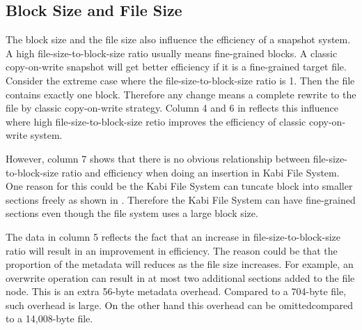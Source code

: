 \subsection{Block Size and File Size}

    The block size and the file size also influence the efficiency of a snapshot system. A high file-size-to-block-size ratio usually means fine-grained blocks. A classic copy-on-write snapshot will get better efficiency if it is a fine-grained target file. Consider the extreme case where the file-size-to-block-size ratio is 1. Then the file contains exactly one block. Therefore any change means a complete rewrite to the file by classic copy-on-write strategy. Column 4 and 6 in  reflects this influence where high file-size-to-block-size retio improves the efficiency of classic copy-on-write system.

    However, column 7 shows that there is no obvious relationship between file-size-to-block-size ratio and efficiency when doing an insertion in Kabi File System. One reason for this could be the Kabi File System can tuncate block into smaller sections freely as shown in . Therefore the Kabi File System can have fine-grained sections even though the file system uses a large block size.
    
    The data in column 5 reflects the fact that an increase in file-size-to-block-size ratio will result in an improvement in efficiency. The reason could be that the proportion of the metadata will reduces as the file size increases. For example, an overwrite operation can result in at most two additional sections added to the file node. This is an extra 56-byte metadata overhead. Compared to a 704-byte file, such overhead is large. On the other hand this overhead can be omittedcompared to a 14,008-byte file.

